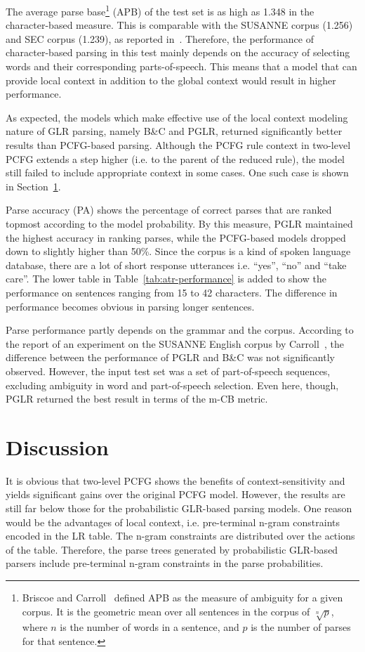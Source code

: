 The average parse base\footnote{Briscoe and Carroll~\cite{Briscoe:95}
  defined APB as the measure of ambiguity for a given corpus. It is
  the geometric mean over all sentences in the corpus of
  $\sqrt[n]{p}$, where $n$ is the number of words in a sentence, and
  $p$ is the number of parses for that sentence.}  (APB) of the test
set is as high as 1.348 in the character-based measure. This is
comparable with the SUSANNE corpus (1.256) and SEC corpus (1.239), as
reported in~\cite{Briscoe:95}.  Therefore, the performance of
character-based parsing in this test mainly depends on the accuracy of
selecting words and their corresponding parts-of-speech.  This means
that a model that can provide local context in addition to the global
context would result in higher performance.

As expected, the models which make effective use of the local context
modeling nature of GLR parsing, namely B\&C and PGLR, returned
significantly better results than PCFG-based parsing. Although the PCFG
rule context in two-level PCFG extends a step higher (i.e. to the parent
of the reduced rule), the model still failed to include appropriate
context in some cases. One such case is shown in
Section~\ref{sec:discussion}.

Parse accuracy (PA) shows the percentage of correct parses that are
ranked topmost according to the model probability. By this measure, PGLR
maintained the highest accuracy in ranking parses, while the PCFG-based
models dropped down to slightly higher than 50\%. Since the corpus is a
kind of spoken language database, there are a lot of short response
utterances i.e. ``yes'', ``no'' and ``take care''. The lower table in
Table~\ref{tab:atr-performance} is added to show the performance on
sentences ranging from 15 to 42 characters. The difference in
performance becomes obvious in parsing longer sentences.

Parse performance partly depends on the grammar and the corpus.
According to the report of an experiment on the SUSANNE English corpus
by Carroll~\cite{Carroll:97}, the difference between the performance
of PGLR and B\&C was not significantly observed. However, the input
test set was a set of part-of-speech sequences, excluding ambiguity in
word and part-of-speech selection. Even here, though, PGLR returned
the best result in terms of the m-CB metric.

\section{Discussion}
\label{sec:discussion}
It is obvious that two-level PCFG shows the benefits of
context-sensitivity and yields significant gains over the original PCFG
model. However, the results are still far below those for the
probabilistic GLR-based parsing models. One reason would be the
advantages of local context, i.e. pre-terminal n-gram constraints
encoded in the LR table. The n-gram constraints are distributed over the
actions of the table. Therefore, the parse trees generated by
probabilistic GLR-based parsers include pre-terminal n-gram constraints
in the parse probabilities.

